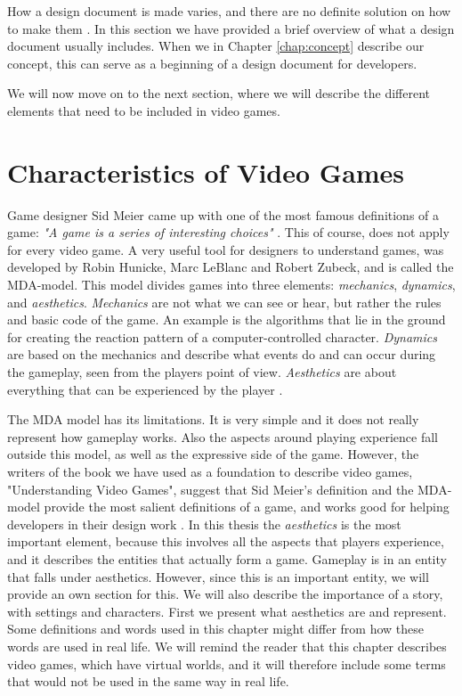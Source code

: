 How a design document is made varies, and there are no definite solution on how to make them \cite{gamedesign}. In this section we have provided a brief overview of what a design document usually includes. When we in Chapter \ref{chap:concept} describe our concept, this can serve as a beginning of a design document for developers.

We will now move on to the next section, where we will describe the different elements that need to be included in video games.
\newpage
\section{Characteristics of Video Games}
\label{sec:videogametheory}

Game designer Sid Meier came up with one of the most famous definitions of a game: \emph{"A game is a series of interesting choices"} \cite{understandingvg}. This of course, does not apply for every video game. A very useful tool for designers to understand games, was developed by Robin Hunicke, Marc LeBlanc and Robert Zubeck, and is called the MDA-model. This model divides games into three elements: \emph{mechanics}, \emph{dynamics}, and \emph{aesthetics}. \emph{Mechanics} are not what we can see or hear, but rather the rules and basic code of the game. An example is the algorithms that lie in the ground for creating the reaction pattern of a computer-controlled character. \emph{Dynamics} are based on the mechanics and describe what events do and can occur during the gameplay, seen from the players point of view. \emph{Aesthetics} are about everything that can be experienced by the player \cite{understandingvg}. 

The MDA model has its limitations. It is very simple and it does not really represent how gameplay works. Also the aspects around playing experience fall outside this model, as well as the expressive side of the game. However, the writers of the book we have used as a foundation to describe video games, "Understanding Video Games", suggest that Sid Meier's definition and the MDA-model provide the most salient definitions of a game, and works good for helping developers in their design work \cite{understandingvg}. In this thesis the \emph{aesthetics} is the most important element, because this involves all the aspects that players experience, and it describes the entities that actually form a game. Gameplay is in \cite{understandingvg} an entity that falls under aesthetics. However, since this is an important entity, we will provide an own section for this. We will also describe the importance of a story, with settings and characters. First we present what aesthetics are and represent. Some definitions and words used in this chapter might differ from how these words are used in real life. We will remind the reader that this chapter describes video games, which have virtual worlds, and it will therefore include some terms that would not be used in the same way in real life.    


